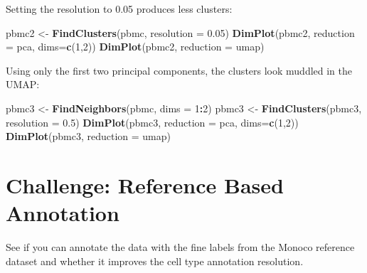 \documentclass[
]{book}
\newenvironment{Shaded}{\begin{snugshade}}{\end{snugshade}}
\newcommand{\AttributeTok}[1]{\textcolor[rgb]{0.13,0.29,0.53}{#1}}
\newcommand{\DecValTok}[1]{\textcolor[rgb]{0.00,0.00,0.81}{#1}}
\newcommand{\FloatTok}[1]{\textcolor[rgb]{0.00,0.00,0.81}{#1}}
\newcommand{\FunctionTok}[1]{\textcolor[rgb]{0.13,0.29,0.53}{\textbf{#1}}}
\newcommand{\NormalTok}[1]{#1}
\newcommand{\OtherTok}[1]{\textcolor[rgb]{0.56,0.35,0.01}{#1}}
\newcommand{\SpecialCharTok}[1]{\textcolor[rgb]{0.81,0.36,0.00}{\textbf{#1}}}
\newcommand{\StringTok}[1]{\textcolor[rgb]{0.31,0.60,0.02}{#1}}
\begin{document}
Setting the resolution to 0.05 produces less clusters:

\begin{Shaded}
\begin{Highlighting}[]
\NormalTok{pbmc2 }\OtherTok{\textless{}{-}} \FunctionTok{FindClusters}\NormalTok{(pbmc, }\AttributeTok{resolution =} \FloatTok{0.05}\NormalTok{)}
\FunctionTok{DimPlot}\NormalTok{(pbmc2, }\AttributeTok{reduction =} \StringTok{\textquotesingle{}pca\textquotesingle{}}\NormalTok{, }\AttributeTok{dims=}\FunctionTok{c}\NormalTok{(}\DecValTok{1}\NormalTok{,}\DecValTok{2}\NormalTok{))}
\FunctionTok{DimPlot}\NormalTok{(pbmc2, }\AttributeTok{reduction =} \StringTok{\textquotesingle{}umap\textquotesingle{}}\NormalTok{)}
\end{Highlighting}
\end{Shaded}

Using only the first two principal components, the clusters look muddled in the UMAP:

\begin{Shaded}
\begin{Highlighting}[]
\NormalTok{pbmc3 }\OtherTok{\textless{}{-}} \FunctionTok{FindNeighbors}\NormalTok{(pbmc, }\AttributeTok{dims =} \DecValTok{1}\SpecialCharTok{:}\DecValTok{2}\NormalTok{)}
\NormalTok{pbmc3 }\OtherTok{\textless{}{-}} \FunctionTok{FindClusters}\NormalTok{(pbmc3, }\AttributeTok{resolution =} \FloatTok{0.5}\NormalTok{)}
\FunctionTok{DimPlot}\NormalTok{(pbmc3, }\AttributeTok{reduction =} \StringTok{\textquotesingle{}pca\textquotesingle{}}\NormalTok{, }\AttributeTok{dims=}\FunctionTok{c}\NormalTok{(}\DecValTok{1}\NormalTok{,}\DecValTok{2}\NormalTok{))}
\FunctionTok{DimPlot}\NormalTok{(pbmc3, }\AttributeTok{reduction =} \StringTok{\textquotesingle{}umap\textquotesingle{}}\NormalTok{)}
\end{Highlighting}
\end{Shaded}

\hypertarget{challenge-reference-based-annotation}{%
\section{Challenge: Reference Based Annotation}\label{challenge-reference-based-annotation}}

See if you can annotate the data with the fine labels from the Monoco reference dataset and whether it improves the cell type annotation resolution.
\end{document}
